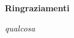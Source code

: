\thispagestyle{empty}

\begin{center}
  {\bf \Huge Ringraziamenti}
\end{center}

\vspace{4cm}


\emph{
	qualcosa	
}
